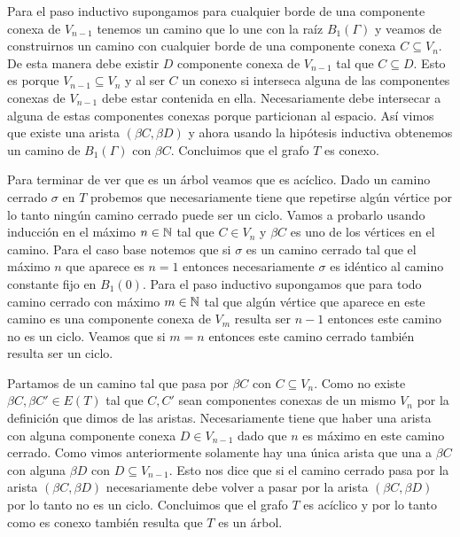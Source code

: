 \documentclass[tesis.tex]{subfiles}
\begin{document}
\begin{ej}
	Para el paso inductivo supongamos para cualquier borde de una componente conexa de $V_{n-1}$ tenemos un camino que lo une con la raíz $B_1(\Gamma)$ y veamos de construirnos un camino con cualquier borde de una componente conexa $C \subseteq V_n$.
	De esta manera debe existir $D$ componente conexa de $V_{n-1}$ tal que $C \subseteq D$. Esto es porque $V_{n-1} \subseteq V_{n}$ y al ser $C$ un conexo si interseca alguna de las componentes conexas de $V_{n-1}$ debe estar contenida en ella. 
	Necesariamente debe intersecar a alguna de estas componentes conexas porque particionan al espacio.
	Así vimos que existe una arista $(\beta C, \beta D)$ y ahora usando la hipótesis inductiva obtenemos un camino de $B_1(\Gamma)$ con $\beta C$.
	Concluimos que el grafo $T$ es conexo.   
	
	Para terminar de ver que es un árbol veamos que es acíclico. 
	Dado un camino cerrado $\sigma$ en $T$ probemos que necesariamente tiene que repetirse algún vértice por lo tanto ningún camino cerrado puede ser un ciclo. Vamos a probarlo usando inducción en el máximo $n \in \mathbb{N}$ tal que $C \in V_n$ y $\beta C$ es uno de los vértices en el camino. 
	Para el caso base notemos que si $\sigma$ es un camino cerrado tal que el máximo $n$ que aparece es $n=1$ entonces necesariamente $\sigma$ es idéntico al camino constante fijo en $B_1(0)$.
	Para el paso inductivo supongamos que para todo camino cerrado con máximo $m \in \mathbb{N}$ tal que algún vértice que aparece en este camino es una componente conexa de $V_m$ resulta ser $n-1$ entonces este camino no es un ciclo. Veamos que si $m=n$ entonces este camino cerrado también resulta ser un ciclo.
	
	Partamos de un camino tal que pasa por $\beta C$ con $C \subseteq V_n$. 
	Como no existe $\beta C, \beta C' \in E(T)$ tal que $C,C'$ sean componentes conexas de un mismo $V_n$ por la definición que dimos de las aristas. 
	Necesariamente tiene que haber una arista con alguna componente conexa $D \in V_{n-1}$ dado que $n$ es máximo en este camino cerrado.   
	Como vimos anteriormente solamente hay una única arista que una a $\beta C$ con alguna $\beta D$ con $D \subseteq V_{n-1}$. 
	Esto nos dice que si el camino cerrado pasa por la arista $(\beta C, \beta D)$ necesariamente debe volver a pasar por la arista $(\beta C, \beta D)$ por lo tanto no es un ciclo. 
	Concluimos que el grafo $T$ es acíclico y por lo tanto como es conexo también resulta que $T$ es un árbol.
	

\end{ej}
\end{document}
